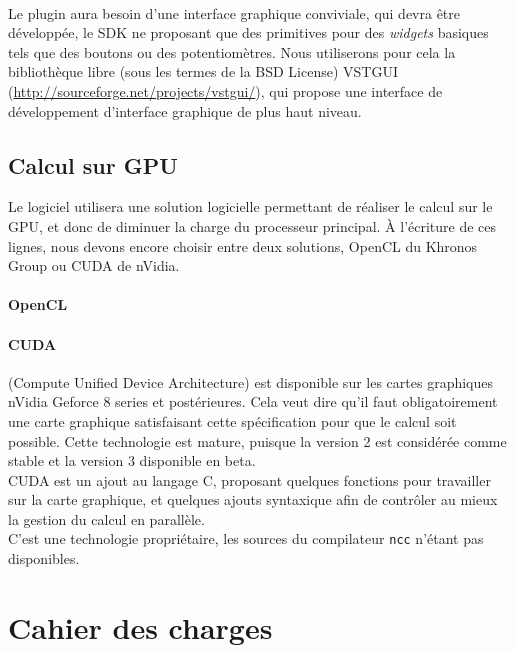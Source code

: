~\\
Le plugin aura besoin d'une interface graphique conviviale, qui devra être développée, le SDK ne proposant que des primitives pour des \emph{widgets} basiques tels que des boutons ou des potentiomètres. Nous utiliserons pour cela la bibliothèque libre (sous les termes de la BSD License) VSTGUI (\url{http://sourceforge.net/projects/vstgui/}), qui propose une interface de développement d'interface graphique de plus haut niveau.
\subsection{Calcul sur GPU}
Le logiciel utilisera une solution logicielle permettant de réaliser le calcul sur le GPU, et donc de diminuer la charge du processeur principal.
À l'écriture de ces lignes, nous devons encore choisir entre deux solutions, OpenCL du Khronos Group ou CUDA de nVidia.
\paragraph{OpenCL}

\paragraph{CUDA}
(Compute Unified Device Architecture) est disponible sur les cartes graphiques nVidia Geforce 8 series et postérieures. Cela veut dire qu'il faut obligatoirement une carte graphique satisfaisant cette spécification pour que le calcul soit possible. Cette technologie est mature, puisque la version 2 est considérée comme stable et la version 3 disponible en beta.
~\\
CUDA est un ajout au langage C, proposant quelques fonctions pour travailler sur la carte graphique, et quelques ajouts syntaxique afin de contrôler au mieux la gestion du calcul en parallèle.
~\\
C'est une technologie propriétaire, les sources du compilateur {\tt ncc} n'étant pas disponibles.
\section{Cahier des charges}


